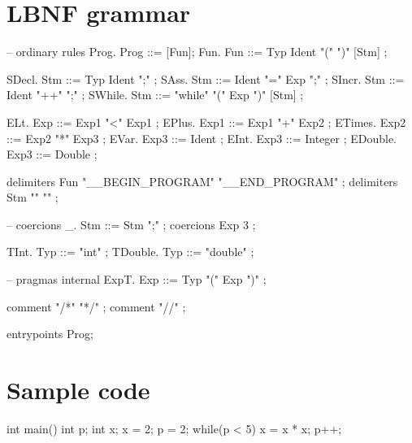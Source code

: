 \documentclass[a4paper,12pt,twosided]{report}
\begin{document}
\section{LBNF grammar}
\begin{code}
-- ordinary rules
Prog.     Prog     ::= [Fun];
Fun.      Fun      ::= Typ Ident "(" ")"  [Stm] ;

SDecl.    Stm      ::= Typ Ident ";"  ;
SAss.     Stm      ::= Ident "=" Exp ";"  ;
SIncr.    Stm      ::= Ident "++" ";"  ;
SWhile.   Stm      ::= "while" "(" Exp ")" [Stm]  ;

ELt.      Exp      ::= Exp1 "<" Exp1 ;
EPlus.    Exp1     ::= Exp1 "+" Exp2 ;
ETimes.   Exp2     ::= Exp2 "*" Exp3 ;
EVar.     Exp3     ::= Ident ;
EInt.     Exp3     ::= Integer ;
EDouble.  Exp3     ::= Double ;

delimiters Fun "__BEGIN_PROGRAM" "__END_PROGRAM" ;
delimiters Stm "{" "}" ;

-- coercions
_.        Stm      ::= Stm ";" ;
coercions Exp 3 ;

TInt.     Typ  ::= "int" ;
TDouble.  Typ  ::= "double" ;

-- pragmas
internal ExpT. Exp ::= Typ "(" Exp ")" ;

comment "/*" "*/" ;
comment "//" ;

entrypoints Prog;
\end{code}

\newpage
\section{Sample code}
\begin{code}
int main() {
    int p;
    int x;
    x = 2;
    p = 2;
    while(p < 5) {
        x = x * x;
        p++;
    }
}
\end{code}
\end{document}
